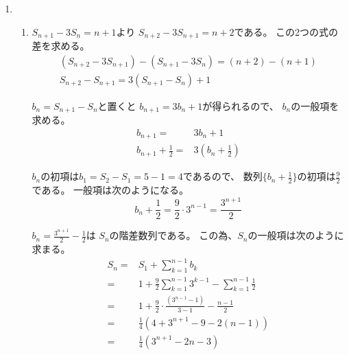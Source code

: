 \documentclass[12pt,b5paper]{ltjsarticle}
\begin{document}
\begin{enumerate}

 \item %

       \begin{enumerate}
        \item %

              $S_{n+1}-3S_n = n+1$より
              $S_{n+2}-3S_{n+1} = n+2$である。
              この2つの式の差を求める。
              \begin{gather}
               (S_{n+2}-3S_{n+1})-(S_{n+1}-3S_{n}) = (n+2)-(n+1)\\
               S_{n+2}-S_{n+1} = 3(S_{n+1} - S_{n}) + 1
              \end{gather}

              $b_n = S_{n+1}-S_{n}$と置くと
              $b_{n+1}=3b_{n}+1$が得られるので、
              $b_n$の一般項を求める。
              \begin{align}
               b_{n+1} =& 3b_{n}+1\\
               b_{n+1}+\frac{1}{2} =& 3 \left( b_{n}+\frac{1}{2} \right)
              \end{align}

              $b_n$の初項は$b_1=S_{2}-S_{1}=5-1=4$であるので、
              数列$\{ b_{n}+\frac{1}{2} \}$の初項は$\frac{9}{2}$である。
              一般項は次のようになる。
              \begin{equation}
               b_{n} + \frac{1}{2} = \frac{9}{2} \cdot 3^{n-1} = \frac{3^{n+1}}{2}
              \end{equation}

              $b_n = \frac{3^{n+1}}{2} - \frac{1}{2}$は
              $S_n$の階差数列である。
              この為、$S_n$の一般項は次のように求まる。
              \begin{align}
               S_n =& S_1 + \sum_{k=1}^{n-1}b_k\\
                =& 1 + \frac{9}{2}\sum_{k=1}^{n-1}3^{k-1} - \sum_{k=1}^{n-1}\frac{1}{2}\\
                =& 1 + \frac{9}{2}\cdot \frac{(3^{n-1}-1)}{3-1} - \frac{n-1}{2}\\
                =& \frac{1}{4} (4 + 3^{n+1} -9 -2(n-1))\\
                =& \frac{1}{4} (3^{n+1} -2n-3)
              \end{align}



\end{enumerate}
\end{enumerate}
\end{document}
